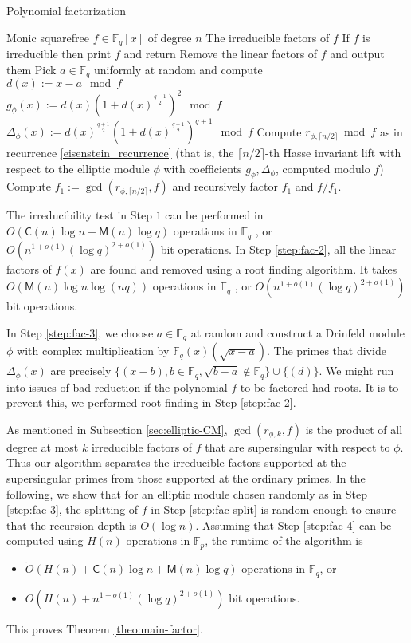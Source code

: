\documentclass[12pt]{article}
\theoremstyle{plain}
\theoremstyle{definition}
\newcommand{\tildO}{\tilde{O}}
\def\F{\ensuremath{\mathbb{F}}}
\def\MM{\ensuremath{\mathsf{M}}}
\def\CC{\ensuremath{\mathsf{C}}}
\newcommand{\D}{\Delta}
\begin{document}
\begin{algorithm}[H]
	\caption{Polynomial factorization}
	\label{alg:factoring}
	\begin{algorithmic}[1]
		\REQUIRE Monic squarefree $f \in \F_q[x]$ of degree $n$
		\ENSURE The irreducible factors of $f$
		\STATE If $f$ is irreducible then print $f$ and return
		\STATE\label{step:fac-2}
		Remove the linear factors of $f$ and output them
		\STATE\label{step:fac-3}
		Pick $a \in \F_q$ uniformly at random and compute \\
		$d(x) := x - a \mod f$ \\
		$g_\phi(x) := d(x)(1+d(x)^{\frac{q-1}{2}})^2 \mod f$ \\
		$\Delta_\phi(x) := d(x)^{\frac{q+1}{2}}(1+d(x)^{\frac{q-1}{2}})^{q+1} \mod f$
		\STATE\label{step:fac-4}
		Compute $r_{\phi, \lceil n / 2 \rceil} \bmod f$ as in recurrence 
		\eqref{eisenstein_recurrence} (that is, the $\lceil n / 2 \rceil$-th Hasse invariant lift 
		with respect to the elliptic module $\phi$ with coefficients $g_\phi, \Delta_\phi$, 
		computed modulo $f$)
		\STATE\label{step:fac-split}
		Compute $f_1 := \gcd(r_{\phi, \lceil n / 2 \rceil}, f)$ and recursively factor $f_1$ and 
		$f/f_1$.
	\end{algorithmic}
\end{algorithm}

The irreducibility test in Step $1$ can be performed in $O(\CC(n)\log n + \MM(n)\log q)$ operations 
in $\F_q$ \cite{vzGG}, or $O(n^{1+o(1)} (\log q)^{2+o(1)})$ bit operations. In Step 
\ref{step:fac-2}, all the linear factors of $f(x)$ are found and removed using a root finding 
algorithm. It takes $O(\MM(n)\log n \log(nq))$ operations in $\F_q$ \cite{vzGG}, or $O(n^{1+o(1)} 
(\log q)^{2+o(1)})$ bit operations.

In Step \ref{step:fac-3}, we choose $a \in \F_q$ at random and construct a Drinfeld module $\phi$ 
with complex multiplication by $\F_q(x)(\sqrt{x-a})$. The primes that divide $\D_\phi(x)$ are 
precisely $\{(x-b),  b \in \F_q, \sqrt{b-a} \notin \F_q\} \cup \{(d)\}$. We might run into issues 
of bad reduction if the polynomial $f$ to be factored had roots. It is to prevent this, we 
performed root finding in Step \ref{step:fac-2}.

As mentioned in Subsection \ref{sec:elliptic-CM}, $\gcd(r_{\phi,k}, f)$ is the product of all 
degree at most $k$ irreducible factors of $f$ that are supersingular with respect to $\phi$. Thus 
our algorithm separates the irreducible factors supported at the supersingular primes from those 
supported at the ordinary primes. In the following, we show that for an elliptic module chosen  
randomly as in Step \ref{step:fac-3}, the splitting of $f$ in Step \ref{step:fac-split} is random 
enough to ensure that the recursion depth is $O(\log n)$. Assuming that Step \ref{step:fac-4} can 
be computed using $H(n)$ operations in $\F_p$, the runtime of the algorithm is 
\begin{itemize}
	\item $\tildO(H(n) + \CC(n)\log n + \MM(n)\log q)$ operations in $\F_q$, or
	\item $O(H(n) + n^{1+o(1)}(\log q)^{2+o(1)})$ bit operations.
\end{itemize}
This proves Theorem \ref{theo:main-factor}.
\end{document}
